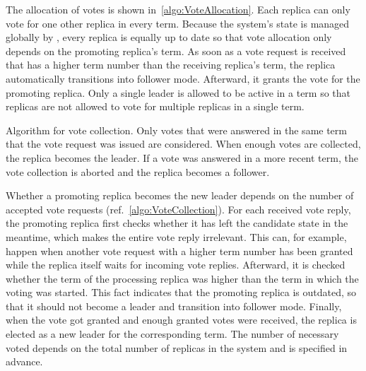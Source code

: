 \noindent
The allocation of votes is shown in~\autoref{algo:VoteAllocation}.
Each replica can only vote for one other replica in every term.
Because the system's state is managed globally by , every replica is equally up to date so that vote allocation only depends on the promoting replica's term.
As soon as a vote request is received that has a higher term number than the receiving replica's term, the replica automatically transitions into follower mode.
Afterward, it grants the vote for the promoting replica.
Only a single leader is allowed to be active in a term so that replicas are not allowed to vote for multiple replicas in a single term.
\\

\noindent
\begin{algorithm}[H]\caption{Algorithm for vote collection. Only votes that were answered in the same term that the vote request was issued are considered. When enough votes are collected, the replica becomes the leader. If a vote was answered in a more recent term, the vote collection is aborted and the replica becomes a follower.}\label{algo:VoteCollection}

\BlankLine

\end{algorithm}

\noindent
Whether a promoting replica becomes the new leader depends on the number of accepted vote requests (ref.~\autoref{algo:VoteCollection}).
For each received vote reply, the promoting replica first checks whether it has left the candidate state in the meantime, which makes the entire vote reply irrelevant.
This can, for example, happen when another vote request with a higher term number has been granted while the replica itself waits for incoming vote replies.
Afterward, it is checked whether the term of the processing replica was higher than the term in which the voting was started.
This fact indicates that the promoting replica is outdated, so that it should not become a leader and transition into follower mode.
Finally, when the vote got granted and enough granted votes were received, the replica is elected as a new leader for the corresponding term.
The number of necessary voted depends on the total number of replicas in the system and is specified in advance.

